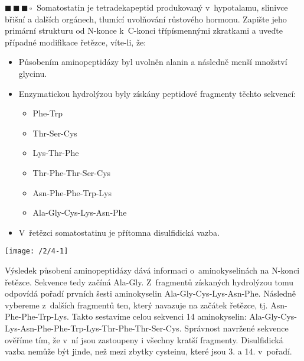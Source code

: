 \documentclass{book}
\newcommand{\tri}{$\blacksquare \, \blacksquare \, \blacksquare \, \square \; \; $}
\renewenvironment{quotation}{\par}{\par} %
\begin{document}
\newpage %
\begin{quotation}
\tri Somatostatin je tetradekapeptid produkovaný v~hypotalamu, slinivce
břišní a dalších orgánech, tlumící uvolňování růstového hormonu. Zapište
jeho primární strukturu od N-konce k~C-konci třípísmennými zkratkami
a uveďte případné modifikace řetězce, víte-li, že: 
\begin{itemize}
\item Působením aminopeptidázy byl uvolněn alanin a následně menší množství
glycinu.
\item Enzymatickou hydrolýzou byly získány peptidové fragmenty těchto sekvencí:
\begin{itemize}
\item Phe-Trp 
\item Thr-Ser-Cys 
\item Lys-Thr-Phe
\item Thr-Phe-Thr-Ser-Cys 
\item Asn-Phe-Phe-Trp-Lys 
\item Ala-Gly-Cys-Lys-Asn-Phe 
\end{itemize}
\item V~řetězci somatostatinu je přítomna disulfidická vazba. 
\end{itemize}
\end{quotation} \dotfill \par 
\begin{center}
\texttt{[image: /2/4-1]}
\end{center}

Výsledek působení aminopeptidázy dává informaci o~aminokyselinách
na N-konci řetězce. Sekvence tedy začíná Ala-Gly. Z~fragmentů získaných
hydrolýzou tomu odpovídá pořadí prvních šesti aminokyselin Ala-Gly-Cys-Lys-Asn-Phe.
Následně vybereme z~dalších fragmentů ten, který navazuje na začátek
řetězce, tj. Asn-Phe-Phe-Trp-Lys. Takto sestavíme celou sekvenci 14
aminokyselin: Ala-Gly-Cys-Lys-Asn-Phe-Phe-Trp-Lys-Thr-Phe-Thr-Ser-Cys.
Správnost navržené sekvence ověříme tím, že v~ní jsou zastoupeny i
všechny kratší fragmenty. Disulfidická vazba nemůže být jinde, než
mezi zbytky cysteinu, které jsou 3. a 14. v~pořadí. 
\end{document}
